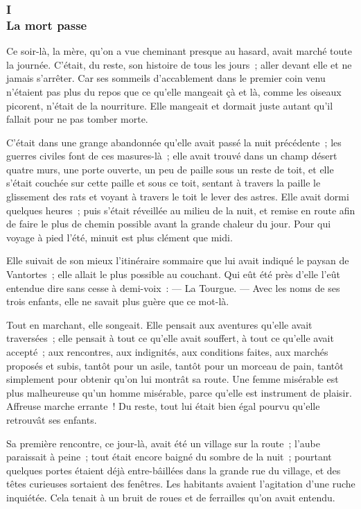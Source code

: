 \documentclass[french,twoside]{book} %
\begin{document}
\subsubsection[{I. La mort passe}]{I \\
La mort passe}
\label{p3l4c1}
\noindent Ce soir-là, la mère, qu’on a vue cheminant presque au hasard, avait marché toute la journée. C’était, du reste, son histoire de tous les jours ; aller devant elle et ne jamais s’arrêter. Car ses sommeils d’accablement dans le premier coin venu n’étaient pas plus du repos que ce qu’elle mangeait çà et là, comme les oiseaux picorent, n’était de la nourriture. Elle mangeait et dormait juste autant qu’il fallait pour ne pas tomber morte.\par
C’était dans une grange abandonnée qu’elle avait passé la nuit précédente ; les guerres civiles font de ces masures-là ; elle avait trouvé dans un champ désert quatre murs, une porte ouverte, un peu de paille sous un reste de toit, et elle s’était couchée sur cette paille  et sous ce toit, sentant à travers la paille le glissement des rats et voyant à travers le toit le lever des astres. Elle avait dormi quelques heures ; puis s’était réveillée au milieu de la nuit, et remise en route afin de faire le plus de chemin possible avant la grande chaleur du jour. Pour qui voyage à pied l’été, minuit est plus clément que midi.\par
Elle suivait de son mieux l’itinéraire sommaire que lui avait indiqué le paysan de Vantortes ; elle allait le plus possible au couchant. Qui eût été près d’elle l’eût entendue dire sans cesse à demi-voix : — La Tourgue. — Avec les noms de ses trois enfants, elle ne savait plus guère que ce mot-là.\par
Tout en marchant, elle songeait. Elle pensait aux aventures qu’elle avait traversées ; elle pensait à tout ce qu’elle avait souffert, à tout ce qu’elle avait accepté ; aux rencontres, aux indignités, aux conditions faites, aux marchés proposés et subis, tantôt pour un asile, tantôt pour un morceau de pain, tantôt simplement pour obtenir qu’on lui montrât sa route. Une femme misérable est plus malheureuse qu’un homme misérable, parce qu’elle est instrument de plaisir. Affreuse marche errante ! Du reste, tout lui était bien égal pourvu qu’elle retrouvât ses enfants.\par
Sa première rencontre, ce jour-là, avait été un village sur la route ; l’aube paraissait à peine ; tout était encore baigné du sombre de la nuit ; pourtant quelques portes étaient déjà entre-bâillées dans la grande rue du village, et des têtes curieuses sortaient des fenêtres. Les habitants avaient l’agitation d’une ruche inquiétée.  Cela tenait à un bruit de roues et de ferrailles qu’on avait entendu.\par
\end{document}
